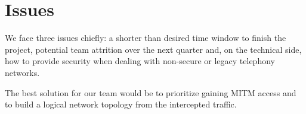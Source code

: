 \section{Issues}


We face three issues chiefly: a shorter than desired time window to finish the project, potential team attrition over the next quarter and, on the technical side, how to provide security when dealing with non-secure or legacy telephony networks.

The best solution for our team would be to prioritize gaining MITM access and to build a logical network topology from the intercepted traffic.